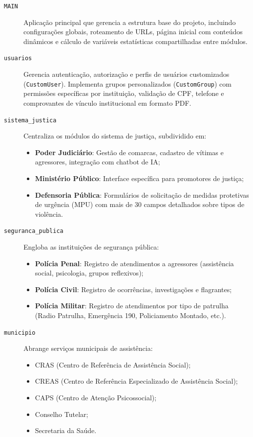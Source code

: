 \begin{description}
   \item[\texttt{MAIN}] Aplicação principal que gerencia a estrutura base do projeto, incluindo configurações globais, roteamento de URLs, página inicial com conteúdos dinâmicos e cálculo de variáveis estatísticas compartilhadas entre módulos.
   
   \item[\texttt{usuarios}] Gerencia autenticação, autorização e perfis de usuários customizados (\texttt{CustomUser}). Implementa grupos personalizados (\texttt{CustomGroup}) com permissões específicas por instituição, validação de CPF, telefone e comprovantes de vínculo institucional em formato PDF.
   
   \item[\texttt{sistema\_justica}] Centraliza os módulos do sistema de justiça, subdividido em:
   \begin{itemize}
      \item \textbf{Poder Judiciário}: Gestão de comarcas, cadastro de vítimas e agressores, integração com chatbot de IA;
      \item \textbf{Ministério Público}: Interface específica para promotores de justiça;
      \item \textbf{Defensoria Pública}: Formulários de solicitação de medidas protetivas de urgência (MPU) com mais de 30 campos detalhados sobre tipos de violência.
   \end{itemize}
   
   \item[\texttt{seguranca\_publica}] Engloba as instituições de segurança pública:
   \begin{itemize}
      \item \textbf{Polícia Penal}: Registro de atendimentos a agressores (assistência social, psicologia, grupos reflexivos);
      \item \textbf{Polícia Civil}: Registro de ocorrências, investigações e flagrantes;
      \item \textbf{Polícia Militar}: Registro de atendimentos por tipo de patrulha (Radio Patrulha, Emergência 190, Policiamento Montado, etc.).
   \end{itemize}
   
   \item[\texttt{municipio}] Abrange serviços municipais de assistência:
   \begin{itemize}
      \item CRAS (Centro de Referência de Assistência Social);
      \item CREAS (Centro de Referência Especializado de Assistência Social);
      \item CAPS (Centro de Atenção Psicossocial);
      \item Conselho Tutelar;
      \item Secretaria da Saúde.
   \end{itemize}
   

\end{description}
